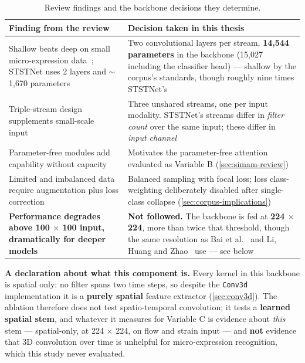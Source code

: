\begin{table}[htbp]
	\centering
	\footnotesize
	\begin{tabular}{@{}p{5.6cm} p{8.0cm}@{}}
		\hline
		\textbf{Finding from the review} & \textbf{Decision taken in this thesis} \\
		\hline
		Shallow beats deep on small micro-expression data~\cite{xia2020b}; STSTNet uses 2 layers and $\sim$1,670 parameters~\cite{liong2019b} & Two convolutional layers per stream, \textbf{14,544 parameters} in the backbone (15,027 including the classifier head) --- shallow by the corpus's standards, though roughly nine times STSTNet's \\
		Triple-stream design supplements small-scale input~\cite{liong2019b} & Three unshared streams, one per input modality. STSTNet's streams differ in \textit{filter count} over the same input; these differ in \textit{input channel} \\
		Parameter-free modules add capability without capacity~\cite{xia2020b} & Motivates the parameter-free attention evaluated as Variable B (\autoref{sec:simam-review}) \\
		Limited and imbalanced data require augmentation plus loss correction~\cite{xia2020a} & Balanced sampling with focal loss; loss class-weighting deliberately disabled after single-class collapse (\autoref{sec:corpus-implications}) \\
		\textbf{Performance degrades above 100 $\times$ 100 input, dramatically for deeper models~\cite{xia2020b}} & \textbf{Not followed.} The backbone is fed at \textbf{224 $\times$ 224}, more than twice that threshold, though the same resolution as Bai et al.~\cite{bai2021} and Li, Huang and Zhao~\cite{liY2021} use --- see below \\
		\hline
	\end{tabular}
	\caption[Review findings and the backbone decisions they determine]{Review findings and the backbone decisions they determine.}
	\label{tab:cnn-decisions}
\end{table}

\textbf{A declaration about what this component is.} Every kernel in this backbone is spatial only: no filter spans two time steps, so despite the \texttt{Conv3d} implementation it is a \textbf{purely spatial} feature extractor (\autoref{sec:conv3d}). The ablation therefore does not test spatio-temporal convolution; it tests a \textbf{learned spatial stem}, and whatever it measures for Variable C is evidence about \textit{this} stem --- spatial-only, at 224 $\times$ 224, on flow and strain input --- and \textbf{not} evidence that 3D convolution over time is unhelpful for micro-expression recognition, which this study never evaluated.


